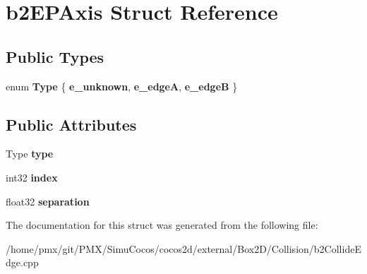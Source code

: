 \hypertarget{structb2EPAxis}{}\section{b2\+E\+P\+Axis Struct Reference}
\label{structb2EPAxis}
\subsection*{Public Types}
\begin{DoxyCompactItemize}
\item 
\mbox{\label{structb2EPAxis_a1a2feab0d321a5cd20677c92cbfd6f3c}} 
enum {\bfseries Type} \{ {\bfseries e\+\_\+unknown}, 
{\bfseries e\+\_\+edgeA}, 
{\bfseries e\+\_\+edgeB}
 \}
\end{DoxyCompactItemize}
\subsection*{Public Attributes}
\begin{DoxyCompactItemize}
\item 
\mbox{\label{structb2EPAxis_a336d3ba4b4ed020a1f6c4c0f70098e39}} 
Type {\bfseries type}
\item 
\mbox{\label{structb2EPAxis_a8e530d411d98e7ab8112c4022f5f65e4}} 
int32 {\bfseries index}
\item 
\mbox{\label{structb2EPAxis_acfd60cfd1f1ad4c448bd0260117ef6fc}} 
float32 {\bfseries separation}
\end{DoxyCompactItemize}


The documentation for this struct was generated from the following file\+:\begin{DoxyCompactItemize}
\item 
/home/pmx/git/\+P\+M\+X/\+Simu\+Cocos/cocos2d/external/\+Box2\+D/\+Collision/b2\+Collide\+Edge.\+cpp\end{DoxyCompactItemize}
